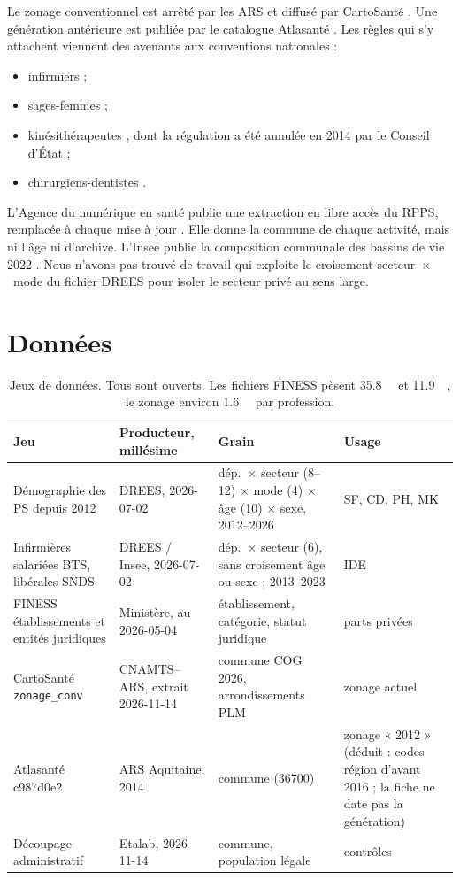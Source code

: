 Le zonage conventionnel est arrêté par les ARS et diffusé par CartoSanté \citep{a4-cartosante2026}. Une génération
antérieure est publiée par le catalogue Atlasanté \citep{a4-atlasante2014zonage}. Les règles qui s'y attachent
viennent des avenants aux conventions nationales :
\begin{itemize}
  \item infirmiers \citep{a4-ameliIde} ;
  \item sages-femmes \citep{a4-ameliSf} ;
  \item kinésithérapeutes \citep{a4-ameliMk}, dont la régulation a été annulée en 2014 par le Conseil d'État
  \citep{a4-ce2014mk} ;
  \item chirurgiens-dentistes \citep{a4-arspaca2025cd}.
\end{itemize}
L'Agence du numérique en santé publie une extraction en libre accès du RPPS, remplacée à chaque mise à jour \citep{a4-ans2026annuaire}.
Elle donne la commune de chaque activité, mais ni l'âge ni d'archive. L'Insee publie la composition communale
des bassins de vie 2022 \citep{a4-insee2026bv}.
Nous n'avons pas trouvé de travail qui exploite le croisement secteur~$\times$~mode du fichier DREES pour isoler
le secteur privé au sens large.

\section{Données}
\begin{table}[h]
\centering\small
\begin{tabular}{@{}p{4.2cm}p{3.1cm}p{4.3cm}p{3.2cm}@{}}
\toprule
Jeu & Producteur, millésime & Grain & Usage \\
\midrule
Démographie des PS depuis 2012 \citep{a4-drees2026demo} & DREES, 2026-07-02 & dép.\ $\times$ secteur (8--12) $\times$ mode (4) $\times$ âge (10) $\times$ sexe, 2012--2026 & SF, CD, PH, MK \\
Infirmières salariées BTS, libérales SNDS \citep{a4-dreesbts2026} & DREES / Insee, 2026-07-02 & dép.\ $\times$ secteur (6), sans croisement âge ou sexe ; 2013--2023 & IDE \\
FINESS établissements et entités juridiques \citep{a4-finessEt2026,a4-finessEj2026} & Ministère, au 2026-05-04 & établissement, catégorie, statut juridique & parts privées \\
CartoSanté \texttt{zonage\_conv} \citep{a4-cartosante2026} & CNAMTS--ARS, extrait 2026-11-14 & commune COG 2026, arrondissements PLM & zonage actuel \\
Atlasanté c987d0e2 \citep{a4-atlasante2014zonage} & ARS Aquitaine, 2014 & commune (\num{36700}) & zonage « 2012 » (déduit : codes région d'avant 2016 ; la fiche ne date pas la génération) \\
Découpage administratif \citep{a4-geoapi2026} & Etalab, 2026-11-14 & commune, population légale & contrôles \\
\bottomrule
\end{tabular}
\caption{Jeux de données. Tous sont ouverts. Les fichiers FINESS pèsent \SI{35.8}{\mega\byte} et
\SI{11.9}{\mega\byte}\mesure{}, le zonage environ \SI{1.6}{\mega\byte} par profession\mesure{}.}
\label{a4-tab:donnees}
\end{table}

